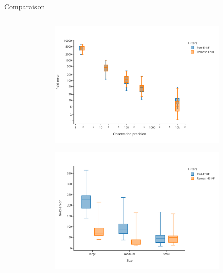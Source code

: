 \documentclass[aspectratio=169]{beamer} %
\begin{document}
\begin{frame}{Comparaison}
\begin{columns}[t]
\begin{column}{0.33\textwidth}
        \end{column}
        \begin{column}{0.33\textwidth}
            \begin{figure}
                \begin{subfigure}{\textwidth}
                    \includegraphics[width=\textwidth]{../../conference/images/dipole_results/MSE_obs_precision_box_log.pdf}
                \end{subfigure}
                \begin{subfigure}{\textwidth}
                    \includegraphics[width=\textwidth]{../../conference/images/dipole_results/MSE_size_box.pdf}
                \end{subfigure}
            \end{figure}
        \end{column}
    \end{columns}
\end{frame}
\end{document}
